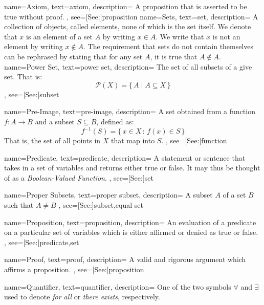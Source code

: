 {
    name={Axiom},
    text={axiom},
    description={
        A proposition that is asserted to be true without proof.
    },
    see=[See:]{proposition}
}
{
    name={Sets},
    text={set},
    description={
        A collection of objects, called elements, none of which is the set
        itself. We denote that $x$ is an element of a set $A$ by writing
        $x\in{A}$. We write that $x$ is not an element by writing
        $x\notin{A}$. The requirement that sets do not contain themselves can
        be rephrased by stating that for any set $A$, it is true that
        $A\notin{A}$.
    }
}
{
    name={Power Set},
    text={power set},
    description={
        The set of all subsets of a give set. That is:
        \begin{equation*}
            \mathcal{P}(X)=\{\,A\;|\;A\subseteq{X}\,\}
        \end{equation*}
    },
    see=[See:]{subset}
}

{
    name={Pre-Image},
    text={pre-image},
    description={
        A set obtained from a function $f:A\rightarrow{B}$
        and a subset $S\subseteq{B}$, defined as:
        \begin{equation*}
            f^{\minus{1}}(S)=\{\,x\in{X}\,:\,f(x)\in{S}\,\}
        \end{equation*}
        That is, the set of all points in $X$ that map into $S$.
    },
    see=[See:]{function}
}

{
    name={Predicate},
    text={predicate},
    description={
        A statement or sentence that takes in a set of variables and returns
        either true or false. It may thus be thought of as a
        \textit{Boolean-Valued Function}.
    },
    see=[See:]{set}
}

{
    name={Proper Subsets},
    text={proper subset},
    description={
        A subset $A$ of a set $B$ such that $A\ne{B}$
    },
    see=[See:]{subset,equal set}
}

{
    name={Proposition},
    text={proposition},
    description={
        An evaluation of a predicate on a particular set of variables which is
        either affirmed or denied as true or false.
    },
    see=[See:]{predicate,set}
}

{
    name={Proof},
    text={proof},
    description={
        A valid and rigorous argument which affirms a proposition.
    },
    see=[See:]{proposition}
}


{
    name={Quantifier},
    text={quantifier},
    description={
        One of the two symbols $\forall$ and $\exists$ used to denote
        \textit{for all} or \textit{there exists}, respectively.
    }
}
